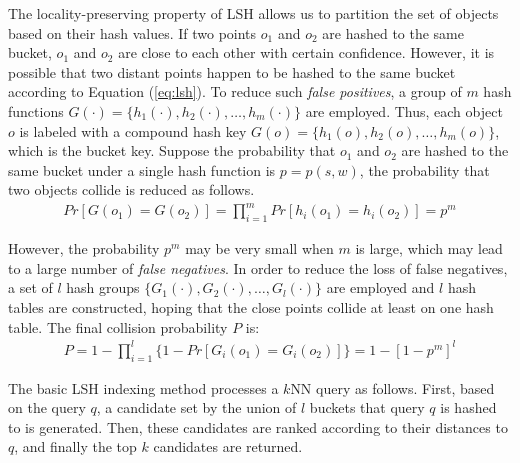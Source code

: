 The locality-preserving property of LSH allows us to partition the set
of objects based on their hash values. If two points $o_1$ and $o_2$ are
hashed to the same bucket, $o_1$ and $o_2$ are close to each
other with certain confidence. However, it is possible that two distant points happen to be hashed to
the same bucket according to Equation (\ref{eq:lsh}). To reduce such
\emph{false positives}, a group of $m$ hash functions
$G(\cdot)=\{h_1(\cdot),h_2(\cdot),\ldots,h_m(\cdot)\}$ are employed. Thus, each object $o$ is labeled with a compound hash key
$G(o)=\{h_1(o),h_2(o),\ldots,h_m(o)\}$, which is the bucket key. Suppose the probability that $o_1$ and $o_2$ are hashed to the same bucket under a single hash function is $p=p(s,w)$, the probability that two objects collide is reduced as follows.
\begin{equation}\label{eq:prob1}
%
\begin{aligned}
%
  Pr[G(o_1)=G(o_2)]=\prod_{i=1}^m Pr[h_i(o_1)=h_i(o_2)]=p^m
%
\end{aligned}
%
\end{equation}


However, the probability $p^m$ may be very small when $m$ is large, which may lead to a large number of \emph{false negatives}. In order to reduce the loss of false negatives, a set of $l$ hash groups $\{G_1(\cdot),G_2(\cdot),\ldots,G_l(\cdot)\}$ are employed and $l$ hash tables are constructed, hoping that the close points collide at least on one hash table. The final collision probability $P$ is:
\begin{equation}\label{eq:prob2}
%
\begin{aligned}
%
  P=1-\prod_{i=1}^l \Big\{1-Pr[G_i(o_1)=G_i(o_2)]\Big\}=1-[1-p^m]^l
\end{aligned}
%
\end{equation}



The basic LSH indexing method processes a $k$NN query as follows. First, based on the query $q$, a candidate set by the union of $l$ buckets that
query $q$ is hashed to is generated. Then, these candidates are ranked according to their distances to $q$, and finally the top $k$ candidates are returned.
